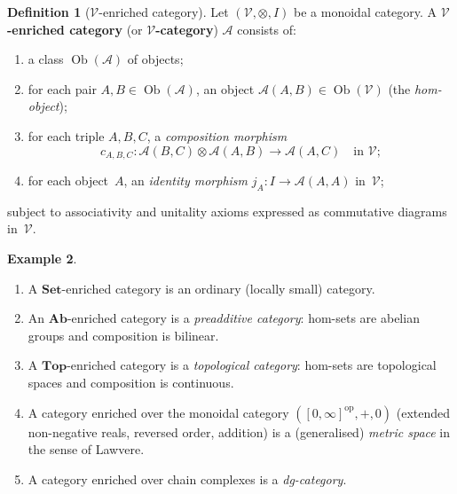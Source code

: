 \documentclass[a4paper,12pt]{book}
\DeclareMathOperator{\Ob}{Ob}
\newcommand{\Set}{\mathbf{Set}}
\newcommand{\Ab}{\mathbf{Ab}}
\newcommand{\Top}{\mathbf{Top}}
\newcommand{\op}{\mathrm{op}}
\theoremstyle{definition}
\newtheorem{definition}{Definition}[section]
\newtheorem{example}[definition]{Example}
\theoremstyle{plain}
\theoremstyle{remark}
\begin{document}
\begin{definition}[$\mathcal{V}$-enriched category]\label{def:enriched-cat}
Let $(\mathcal{V}, \otimes, I)$ be a monoidal category.
A \textbf{$\mathcal{V}$-enriched category} (or \textbf{$\mathcal{V}$-category})
$\mathcal{A}$ consists of:
\begin{enumerate}[label=(\roman*)]
\item a class $\Ob(\mathcal{A})$ of objects;
\item for each pair $A,B\in\Ob(\mathcal{A})$, an object
      $\mathcal{A}(A,B)\in\Ob(\mathcal{V})$ (the \emph{hom-object});
\item for each triple $A,B,C$, a \emph{composition morphism}
      \[
          c_{A,B,C}\colon \mathcal{A}(B,C)\otimes\mathcal{A}(A,B)
          \longrightarrow \mathcal{A}(A,C) \quad\text{in }\mathcal{V};
      \]
\item for each object~$A$, an \emph{identity morphism}
      $j_A\colon I\to\mathcal{A}(A,A)$ in~$\mathcal{V}$;
\end{enumerate}
subject to associativity and unitality axioms expressed as commutative
diagrams in~$\mathcal{V}$.
\end{definition}

\begin{example}\label{ex:enriched-examples}
\begin{enumerate}[label=(\roman*)]
\item A $\Set$-enriched category is an ordinary (locally small) category.
\item An $\Ab$-enriched category is a \emph{preadditive category}:
      hom-sets are abelian groups and composition is bilinear.
\item A $\Top$-enriched category is a \emph{topological category}:
      hom-sets are topological spaces and composition is continuous.
\item A category enriched over the monoidal category $([0,\infty]^{\op}, +, 0)$
      (extended non-negative reals, reversed order, addition) is a
      (generalised) \emph{metric space} in the sense of Lawvere.
\item A category enriched over chain complexes is a \emph{dg-category}.
\end{enumerate}
\end{example}
\end{document}
